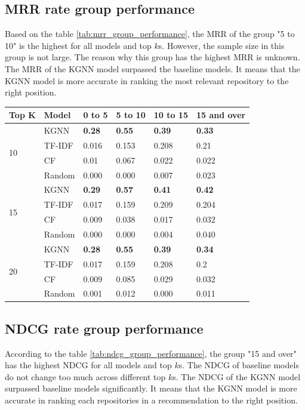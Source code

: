 \documentclass[11pt,twoside]{report}
\begin{document}
\subsection{MRR rate group performance}
Based on the table \ref{tab:mrr_group_performance}, the MRR of the group "5 to 10" is the highest for all models and top $k$s. However, the sample size in this group is not large. The reason why this group has the highest MRR is unknown. The MRR of the KGNN model surpassed the baseline models. It means that the KGNN model is more accurate in ranking the most relevant repository to the right position.

\begin{center}
    \begin{tabular}{l | l | l | l | l | l}
    \hline
    Top K & Model & 0 to 5 & 5 to 10 & 10 to 15 & 15 and over \\
    \hline
    \multirow{4}{*}{10} 
    & KGNN & \textbf{0.28} & \textbf{0.55} & \textbf{0.39} & \textbf{0.33} \\
    & TF-IDF & 0.016 & 0.153 & 0.208 & 0.21 \\
    & CF & 0.01 & 0.067 & 0.022 & 0.022 \\
    & Random & 0.000 & 0.000 & 0.007 & 0.023 \\
    \hline
    \multirow{4}{*}{15}
    & KGNN & \textbf{0.29} & \textbf{0.57} & \textbf{0.41} & \textbf{0.42} \\
    & TF-IDF & 0.017 & 0.159 & 0.209 & 0.204 \\
    & CF & 0.009 & 0.038 & 0.017 & 0.032 \\
    & Random & 0.000 & 0.000 & 0.004 & 0.040 \\
    \hline
    \multirow{4}{*}{20}
    & KGNN & \textbf{0.28} & \textbf{0.55} & \textbf{0.39} & \textbf{0.34} \\
    & TF-IDF & 0.017 & 0.159 & 0.208 & 0.2 \\
    & CF & 0.009 & 0.085 & 0.029 & 0.032 \\
    & Random & 0.001 & 0.012 & 0.000 & 0.011 \\
    \end{tabular}
    \label{tab:mrr_group_performance}
\end{center}

\subsection{NDCG rate group performance}
According to the table \ref{tab:ndcg_group_performance}, the group "15 and over" has the highest NDCG for all models and top $k$s. The NDCG of baseline models do not change too much across different top $k$s. The NDCG of the KGNN model surpassed baseline models significantly. It means that the KGNN model is more accurate in ranking each repositories in a recommendation to the right position.
\end{document}

